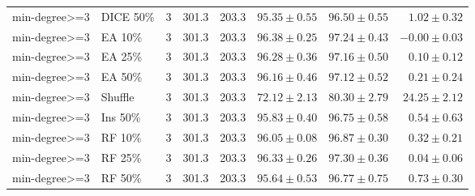 {\begin{longtable}{llrrrrrr}
min-degree>=3 & DICE 50\% & 3 & 301.3 & 203.3 & $95.35\pm0.55$ & $96.50\pm0.55$ & $1.02\pm0.32$ \\
min-degree>=3 & EA 10\% & 3 & 301.3 & 203.3 & $96.38\pm0.25$ & $97.24\pm0.43$ & $-0.00\pm0.03$ \\
min-degree>=3 & EA 25\% & 3 & 301.3 & 203.3 & $96.28\pm0.36$ & $97.16\pm0.50$ & $0.10\pm0.12$ \\
min-degree>=3 & EA 50\% & 3 & 301.3 & 203.3 & $96.16\pm0.46$ & $97.12\pm0.52$ & $0.21\pm0.24$ \\
min-degree>=3 & Shuffle & 3 & 301.3 & 203.3 & $72.12\pm2.13$ & $80.30\pm2.79$ & $24.25\pm2.12$ \\
min-degree>=3 & Ins 50\% & 3 & 301.3 & 203.3 & $95.83\pm0.40$ & $96.75\pm0.58$ & $0.54\pm0.63$ \\
min-degree>=3 & RF 10\% & 3 & 301.3 & 203.3 & $96.05\pm0.08$ & $96.87\pm0.30$ & $0.32\pm0.21$ \\
min-degree>=3 & RF 25\% & 3 & 301.3 & 203.3 & $96.33\pm0.26$ & $97.30\pm0.36$ & $0.04\pm0.06$ \\
min-degree>=3 & RF 50\% & 3 & 301.3 & 203.3 & $95.64\pm0.53$ & $96.77\pm0.75$ & $0.73\pm0.30$ \\
\end{longtable}
}

